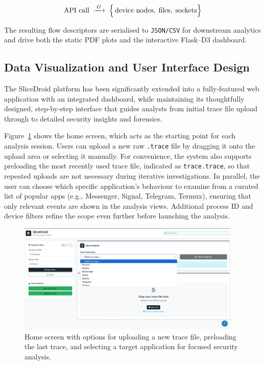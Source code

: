 \documentclass[a4paper,12pt]{report}
\begin{document}
\[
  \text{API call} \;\xrightarrow{\;G\;}\;
  \Bigl\{\,
     \text{device nodes},\;
     \text{files},\;
     \text{sockets}
  \Bigr\}
\]

\noindent
The resulting flow descriptors are serialised to
\texttt{JSON/CSV} for downstream analytics and drive both the static
PDF plots and the interactive Flask–D3 dashboard.


\subsection{Data Visualization and User Interface Design}

The SliceDroid platform has been significantly extended into a fully-featured web application with an integrated dashboard, while maintaining its thoughtfully designed, step-by-step interface that guides analysts from initial trace file upload through to detailed security insights and forensics.

Figure~\ref{fig:home_screen} shows the home screen, which acts as the starting point for each analysis session. Users can upload a new raw \texttt{.trace} file by dragging it onto the upload area or selecting it manually. For convenience, the system also supports preloading the most recently used trace file, indicated as \texttt{trace.trace}, so that repeated uploads are not necessary during iterative investigations. In parallel, the user can choose which specific application’s behaviour to examine from a curated list of popular apps (e.g., Messenger, Signal, Telegram, Termux), ensuring that only relevant events are shown in the analysis views. Additional process ID and device filters refine the scope even further before launching the analysis.

\begin{figure}[H]
\centering
\includegraphics[width=0.95\textwidth]{home_screen.png}
\caption{Home screen with options for uploading a new trace file, preloading the last trace, and selecting a target application for focused security analysis.}
\label{fig:home_screen}
\end{figure}
\end{document}
